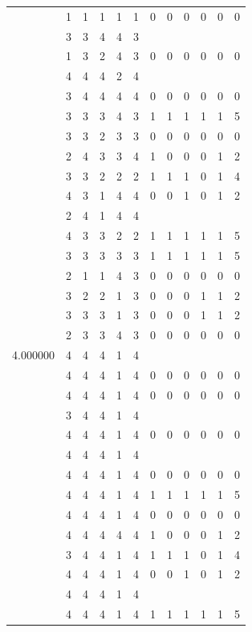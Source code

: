 \documentclass[]{book}
\theoremstyle{definition}
\theoremstyle{definition}
\theoremstyle{definition}
\theoremstyle{remark}
\begin{document}
\begin{table}
{\begin{tabular}[t]{rrrrrrrrrrrr}
 & 1 & 1 & 1 & 1 & 1 & 0 & 0 & 0 & 0 & 0 & 0\\
 & 3 & 3 & 4 & 4 & 3 &  &  &  &  &  & \\
 & 1 & 3 & 2 & 4 & 3 & 0 & 0 & 0 & 0 & 0 & 0\\
 & 4 & 4 & 4 & 2 & 4 &  &  &  &  &  & \\
 & 3 & 4 & 4 & 4 & 4 & 0 & 0 & 0 & 0 & 0 & 0\\
 & 3 & 3 & 3 & 4 & 3 & 1 & 1 & 1 & 1 & 1 & 5\\
 & 3 & 3 & 2 & 3 & 3 & 0 & 0 & 0 & 0 & 0 & 0\\
 & 2 & 4 & 3 & 3 & 4 & 1 & 0 & 0 & 0 & 1 & 2\\
 & 3 & 3 & 2 & 2 & 2 & 1 & 1 & 1 & 0 & 1 & 4\\
 & 4 & 3 & 1 & 4 & 4 & 0 & 0 & 1 & 0 & 1 & 2\\
 & 2 & 4 & 1 & 4 & 4 &  &  &  &  &  & \\
 & 4 & 3 & 3 & 2 & 2 & 1 & 1 & 1 & 1 & 1 & 5\\
 & 3 & 3 & 3 & 3 & 3 & 1 & 1 & 1 & 1 & 1 & 5\\
 & 2 & 1 & 1 & 4 & 3 & 0 & 0 & 0 & 0 & 0 & 0\\
 & 3 & 2 & 2 & 1 & 3 & 0 & 0 & 0 & 1 & 1 & 2\\
 & 3 & 3 & 3 & 1 & 3 & 0 & 0 & 0 & 1 & 1 & 2\\
 & 2 & 3 & 3 & 4 & 3 & 0 & 0 & 0 & 0 & 0 & 0\\
4.000000 & 4 & 4 & 4 & 1 & 4 &  &  &  &  &  & \\
 & 4 & 4 & 4 & 1 & 4 & 0 & 0 & 0 & 0 & 0 & 0\\
 & 4 & 4 & 4 & 1 & 4 & 0 & 0 & 0 & 0 & 0 & 0\\
 & 3 & 4 & 4 & 1 & 4 &  &  &  &  &  & \\
 & 4 & 4 & 4 & 1 & 4 & 0 & 0 & 0 & 0 & 0 & 0\\
 & 4 & 4 & 4 & 1 & 4 &  &  &  &  &  & \\
 & 4 & 4 & 4 & 1 & 4 & 0 & 0 & 0 & 0 & 0 & 0\\
 & 4 & 4 & 4 & 1 & 4 & 1 & 1 & 1 & 1 & 1 & 5\\
 & 4 & 4 & 4 & 1 & 4 & 0 & 0 & 0 & 0 & 0 & 0\\
 & 4 & 4 & 4 & 4 & 4 & 1 & 0 & 0 & 0 & 1 & 2\\
 & 3 & 4 & 4 & 1 & 4 & 1 & 1 & 1 & 0 & 1 & 4\\
 & 4 & 4 & 4 & 1 & 4 & 0 & 0 & 1 & 0 & 1 & 2\\
 & 4 & 4 & 4 & 1 & 4 &  &  &  &  &  & \\
 & 4 & 4 & 4 & 1 & 4 & 1 & 1 & 1 & 1 & 1 & 5\\

\end{tabular}}
\end{table}
\end{document}
